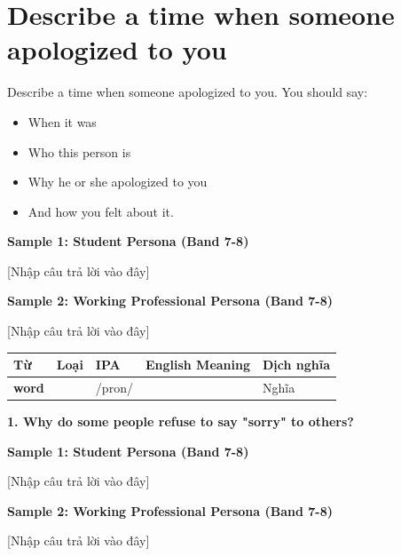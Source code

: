 \newpage

\section{Describe a time when someone apologized to you}
\begin{ieltsprompt}
Describe a time when someone apologized to you.
You should say:
\begin{itemize}[leftmargin=2em, itemsep=2pt]
\item When it was
\item Who this person is
\item Why he or she apologized to you
\item And how you felt about it.
\end{itemize}
\end{ieltsprompt}
\begin{ieltsanswer}
\textbf{Sample 1: Student Persona (Band 7-8)}

[Nhập câu trả lời vào đây]

\textbf{Sample 2: Working Professional Persona (Band 7-8)}

[Nhập câu trả lời vào đây]
\end{ieltsanswer}


\vspace{0.8em}
\begin{center}
\renewcommand{\arraystretch}{1.65}
\begin{tabularx}{\textwidth}{|V{0.22\textwidth}|C{0.07\textwidth}|I{0.20\textwidth}|Y|V{0.18\textwidth}|}
\hline
{}
\textbf{Từ} & \textbf{Loại} & \textbf{IPA} & \textbf{English Meaning} & \textbf{Dịch nghĩa} \\
\hline
\textbf{word} & & /pron/ & & Nghĩa \\ \hline
\end{tabularx}
\end{center}

\partthreeheader

\begin{ieltsquestion}
\textbf{1. Why do some people refuse to say "sorry" to others?}
\end{ieltsquestion}
\textbf{Sample 1: Student Persona (Band 7-8)}

[Nhập câu trả lời vào đây]

\textbf{Sample 2: Working Professional Persona (Band 7-8)}

[Nhập câu trả lời vào đây]


